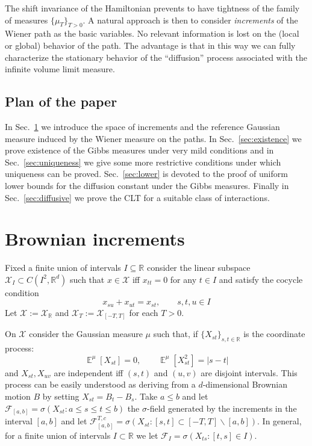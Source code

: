 \documentclass[a4paper,12pt,reqno]{amsart}
\DeclareMathOperator{\expect}{{\mathbb E}}
\newcommand{\R}{\mathbb{R}}
\newcommand{\X}{\mathcal{X}}
\newcommand{\F}{\mathcal{F}}
\begin{document}
The shift invariance of the Hamiltonian prevents to have tightness of
the family of measures $\{\mu_T\}_{T > 0}$. A natural approach is then
to consider \emph{increments} of the Wiener path as the basic
variables. No relevant information is lost on the (local
or global) behavior  of the path.  The advantage is that in this way we
can fully characterize the stationary behavior of the ``diffusion'' process
 associated with the infinite volume limit measure.




\subsection*{
Plan of the paper} In Sec.~\ref{sect:increments} we introduce the
space of increments and the reference Gaussian measure induced by the
Wiener measure on the paths. In Sec.~\ref{sec:existence} we prove
existence of the Gibbs measures under very mild conditions and in
Sec.~\ref{sec:uniqueness} we give some more restrictive conditions
under which uniqueness can be proved. Sec.~\ref{sec:lower} is devoted to the proof of uniform lower bounds for the diffusion constant under the Gibbs measures.
Finally in Sec.~\ref{sec:diffusive} we prove the CLT for a suitable
class of interactions.
 
 
\section{Brownian increments}
\label{sect:increments}
Fixed a finite union of intervals $I \subseteq \R$ consider the linear subspace $\X_I \subset C(I^2,\R^d)$ such that $x \in \X$
iff $x_{tt} = 0$ for any $t \in I$ and satisfy the cocycle condition
\begin{equation}
  \label{eq:cocycle}
 x_{su} + x_{ut} = x_{st}, \qquad s,t,u \in I 
\end{equation}
Let $\X := \X_\R$ and $\X_T := \X_{[-T,T]}$ for each $T > 0$.


On $\X$ consider the Gaussian measure $\mu$ such that, if $\{X_{st}\}_{s,t \in\R}$ is
the coordinate process:
$$
\expect^\mu [X_{st }]= 0, \qquad \expect^\mu [X_{st}^2] = |s-t|
$$
and $X_{st},X_{uv}$ are independent iff $(s,t)$ and $(u,v)$ are
disjoint intervals.
This process can be easily understood as deriving from a $d$-dimensional Brownian
motion $B$ by setting $X_{st} = B_t - B_s$. 
Take $a \le b$ and let $\mathcal{F}_{[a,b]} = \sigma(X_{st} : a \le s \le t \le b)$ the
$\sigma$-field generated by the increments in the interval $[a,b]$ and
let
 $\mathcal{F}^{T,c}_{[a,b]} = \sigma(X_{st} : [s,t] \subset [-T,T] \backslash [a,b])$. In general, for a finite union of intervals $I \subset \R$ we let $\F_I = \sigma(X_{ts}: [t,s] \in I)$.
\end{document}
